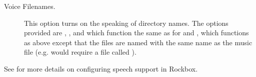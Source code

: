 \begin{description}
  \item[Voice Filenames.]
    This option turns on the speaking of directory names.  The options provided
    are , , and  which function 
    the same as for  and ,
    which functions as above except that the files are named with the same
    name as the music file (e.g.  would require a
    file called ).

  \end{description}

See  for more details on configuring speech support in Rockbox.
